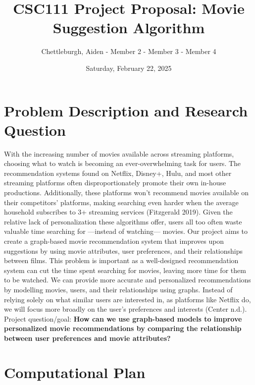 \documentclass[11pt]{article}
\title{CSC111 Project Proposal: Movie Suggestion Algorithm}
\author{Chettleburgh, Aiden - Member 2 - Member 3 - Member 4}
\date{Saturday, February 22, 2025}
\begin{document}
\maketitle

\section*{Problem Description and Research Question}
With the increasing number of movies available across streaming platforms, choosing what to watch is becoming an ever-overwhelming task for users. The recommendation systems found on Netflix, Disney+, Hulu, and most other streaming platforms often disproportionately promote their own in-house productions. Additionally, these platforms won't recommend movies available on their competitors' platforms, making searching even harder when the average household subscribes to 3+ streaming services (Fitzgerald 2019). Given the relative lack of personalization these algorithms offer, users all too often waste valuable time searching for —instead of watching— movies. Our project aims to create a graph-based movie recommendation system that improves upon suggestions by using movie attributes, user preferences, and their relationships between films. This problem is important as a well-designed recommendation system can cut the time spent searching for movies, leaving more time for them to be watched. We can provide more accurate and personalized recommendations by modelling movies, users, and their relationships using graphs. Instead of relying solely on what similar users are interested in, as platforms like Netflix do, we will focus more broadly on the user's preferences and interests (Center n.d.).\\
Project question/goal: \textbf{How can we use graph-based models to improve personalized movie recommendations by comparing the relationship between user preferences and movie attributes?}

\section*{Computational Plan}
\end{document}
